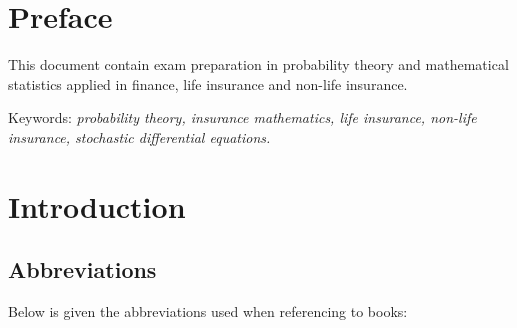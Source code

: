 \documentclass[a4paper,12pt,openany]{book}
\begin{document}
\hspace{1pt}
\newpage

\chapter*{Preface}

This document contain exam preparation in probability theory and mathematical statistics applied in finance, life insurance and non-life insurance.

\vspace{5pt}
\noindent Keywords: \emph{probability theory, insurance mathematics, life insurance,
non-life insurance, stochastic differential equations.}

\newpage

\begin{spacing}{1}
\tableofcontents
\end{spacing}

\newpage

\setcounter{page}{1}
\pagestyle{fancy}
\fancyhf{}
\renewcommand{\headrulewidth}{0pt}
\fancyhead[LE]{\fontsize{11}{12} \selectfont\nouppercase{\thepage}}
\fancyhead[RE]{\fontsize{11}{12} \selectfont\nouppercase{\leftmark}}
\fancyhead[LO]{\fontsize{11}{12} \selectfont\nouppercase{\rightmark}}
\fancyhead[RO]{\fontsize{11}{12} \selectfont\nouppercase{\thepage}}
\allowdisplaybreaks
\setlength{\abovedisplayskip}{10pt}
\setlength{\belowdisplayskip}{10pt}
\setlength{\abovedisplayshortskip}{-12pt}%
\setlength{\belowdisplayshortskip}{0pt}
\hypertarget{introduction}{%
\chapter{Introduction}\label{introduction}}

\hypertarget{abbreviations}{%
\section{Abbreviations}\label{abbreviations}}

Below is given the abbreviations used when referencing to books:
\end{document}
